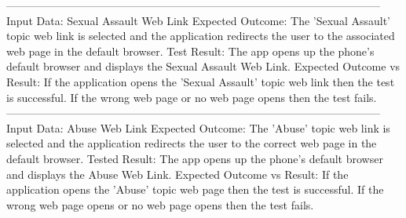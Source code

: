 \documentclass[letterpaper,12pt,titlepage]{article}
\begin{document}
------------------------------------------------------------------------------------------------------
\newline
Input Data: Sexual Assault Web Link
\newline
\newline
Expected Outcome: The 'Sexual Assault' topic web link is selected and the application redirects the user to the associated web page in the default browser.
\newline
\newline
Test Result: The app opens up the phone’s default browser and displays the Sexual Assault Web Link.
\newline
\newline
Expected Outcome vs Result: If the application opens the 'Sexual Assault' topic web link then the test is successful. If the wrong web page or no web page opens then the test fails.
\newline
\newline
------------------------------------------------------------------------------------------------------
\newline
Input Data: Abuse Web Link
\newline
\newline
Expected Outcome: The 'Abuse' topic web link is selected and the application redirects the user to the correct web page in the default browser.
\newline
\newline
Tested Result: The app opens up the phone’s default browser and displays the Abuse Web Link.
\newline
\newline
Expected Outcome vs Result: If the application opens the 'Abuse' topic web page then the test is successful. If the wrong web page opens or no web page opens then the test fails.

\newpage
\end{document}

